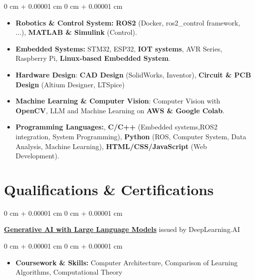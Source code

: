 \documentclass[10pt, letterpaper]{article}
\newenvironment{highlights}{
    \begin{itemize}[
        topsep=0.10 cm,
        parsep=0.10 cm,
        partopsep=0pt,
        itemsep=0pt,
        leftmargin=0 cm + 10pt
    ]
}{
    \end{itemize}
} %
\newenvironment{highlightsforbulletentries}{
    \begin{itemize}[
        topsep=0.10 cm,
        parsep=0.10 cm,
        partopsep=0pt,
        itemsep=0pt,
        leftmargin=10pt
    ]
}{
    \end{itemize}
} %
\newenvironment{onecolentry}{
    \begin{adjustwidth}{
        0 cm + 0.00001 cm
    }{
        0 cm + 0.00001 cm
    }
}{
    \end{adjustwidth}
} %
\newenvironment{twocolentry}[2][]{
    \onecolentry
    \def\secondColumn{#2}
    \setcolumnwidth{\fill, 4.5 cm}
    \begin{paracol}{2}
}{
    \switchcolumn \raggedleft \secondColumn
    \end{paracol}
    \endonecolentry
} %
\begin{document}
\begin{onecolentry}
      \begin{highlightsforbulletentries}

            \item \textbf{Robotics \& Control System:} \textbf{ROS2} (Docker, ros2\_control framework, ...), \textbf{MATLAB \& Simulink} (Control).
            \item \textbf{Embedded Systems:} STM32, ESP32, \textbf{IOT systems}, AVR Series, Raspberry Pi, \textbf{Linux-based Embedded System}.
            \item \textbf{Hardware Design}: \textbf{CAD Design} (SolidWorks, Inventor), \textbf{Circuit \& PCB Design} (Altium Designer, LTSpice)
            \item \textbf{Machine Learning \& Computer Vision}: Computer Vision with \textbf{OpenCV},
            LLM and Machine Learning on \textbf{AWS \& Google Colab}.
            \item \textbf{Programming Languages:},
            \textbf{C/C++} (Embedded systems,ROS2 integration, System Programming), \textbf{Python} (ROS, Computer System, Data Analysis, Machine Learning),
            \textbf{HTML/CSS/JavaScript} (Web Development).

      \end{highlightsforbulletentries}
\end{onecolentry}

\section{Qualifications \& Certifications}

\begin{twocolentry}{
            issued by DeepLearning.AI
      }
      \textbf{\href{https://www.coursera.org/account/accomplishments/verify/GS66RVWG9TQ8}{Generative AI with Large Language Models}}\end{twocolentry}

\vspace{0.10 cm}
\begin{onecolentry}
      \begin{highlights}

            \item \textbf{Coursework \& Skills:} Computer Architecture, Comparison of Learning Algorithms, Computational Theory

      \end{highlights}
\end{onecolentry}
\end{document}
